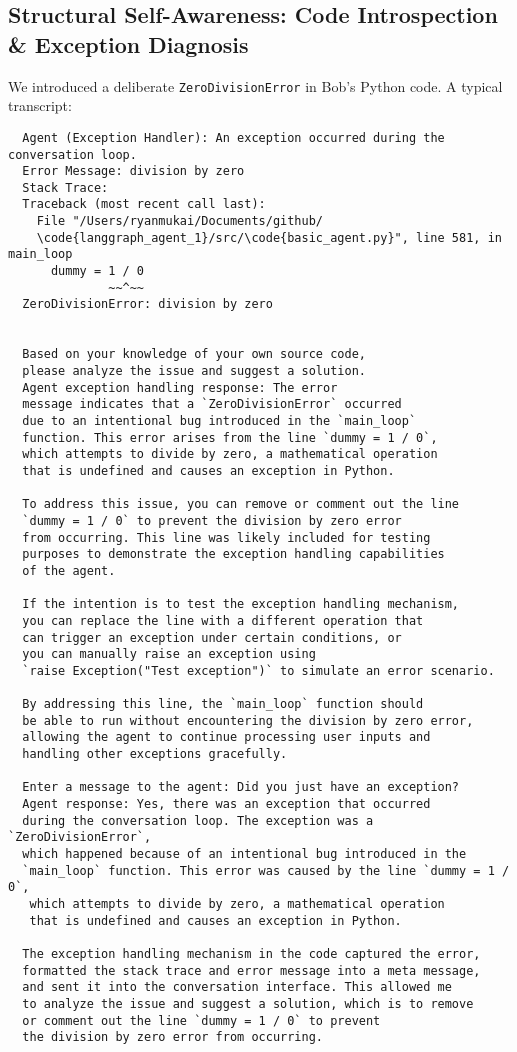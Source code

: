 \documentclass[conference]{IEEEtran}
\newcommand{\code}[1]{\texttt{\detokenize{#1}}}
\begin{document}
\subsection{Structural Self-Awareness: Code Introspection \& Exception Diagnosis}
We introduced a deliberate \texttt{ZeroDivisionError} in Bob’s Python code. A typical transcript:
\begin{verbatim}
  Agent (Exception Handler): An exception occurred during the conversation loop.
  Error Message: division by zero
  Stack Trace:
  Traceback (most recent call last):
    File "/Users/ryanmukai/Documents/github/
    \code{langgraph_agent_1}/src/\code{basic_agent.py}", line 581, in main_loop
      dummy = 1 / 0
              ~~^~~
  ZeroDivisionError: division by zero
  
  
  Based on your knowledge of your own source code, 
  please analyze the issue and suggest a solution.
  Agent exception handling response: The error 
  message indicates that a `ZeroDivisionError` occurred 
  due to an intentional bug introduced in the `main_loop` 
  function. This error arises from the line `dummy = 1 / 0`, 
  which attempts to divide by zero, a mathematical operation 
  that is undefined and causes an exception in Python.
  
  To address this issue, you can remove or comment out the line 
  `dummy = 1 / 0` to prevent the division by zero error 
  from occurring. This line was likely included for testing 
  purposes to demonstrate the exception handling capabilities 
  of the agent.
  
  If the intention is to test the exception handling mechanism, 
  you can replace the line with a different operation that 
  can trigger an exception under certain conditions, or 
  you can manually raise an exception using 
  `raise Exception("Test exception")` to simulate an error scenario.
  
  By addressing this line, the `main_loop` function should 
  be able to run without encountering the division by zero error, 
  allowing the agent to continue processing user inputs and 
  handling other exceptions gracefully.

  Enter a message to the agent: Did you just have an exception?
  Agent response: Yes, there was an exception that occurred 
  during the conversation loop. The exception was a `ZeroDivisionError`, 
  which happened because of an intentional bug introduced in the 
  `main_loop` function. This error was caused by the line `dummy = 1 / 0`,
   which attempts to divide by zero, a mathematical operation 
   that is undefined and causes an exception in Python.
  
  The exception handling mechanism in the code captured the error, 
  formatted the stack trace and error message into a meta message, 
  and sent it into the conversation interface. This allowed me 
  to analyze the issue and suggest a solution, which is to remove 
  or comment out the line `dummy = 1 / 0` to prevent 
  the division by zero error from occurring.
  
\end{verbatim}
\end{document}

